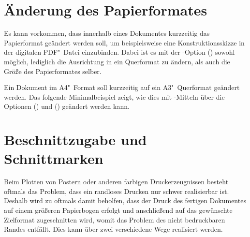 \section{Änderung des Papierformates}
%
%
Es kann vorkommen, dass innerhalb eines Dokumentes kurzzeitig das Papierformat 
geändert werden soll, um beispielsweise eine Konstruktionsskizze in der 
digitalen PDF"~Datei einzubinden. Dabei ist es mit der \KOMAScript-Option 
() sowohl möglich, lediglich die 
Ausrichtung in ein Querformat zu ändern, als auch die Größe des Papierformates 
selber.
%
\begin{Example}
Ein Dokument im A4"~Format soll kurzzeitig auf ein A3"~Querformat geändert 
werden. Das folgende Minimalbeispiel zeigt, wie dies mit \KOMAScript-Mitteln 
über die Optionen () und 
() geändert werden kann.
\end{Example}




\section{Beschnittzugabe und Schnittmarken}
%
%
%
%
Beim Plotten von Postern oder anderen farbigen Druckerzeugnissen besteht 
oftmals das Problem, dass ein randloses Drucken nur schwer realisierbar ist. 
Deshalb wird zu oftmals damit beholfen, dass der Druck des fertigen Dokumentes 
auf einem größeren Papierbogen erfolgt und anschließend auf das gewünschte 
Zielformat zugeschnitten wird, womit das Problem des nicht bedruckbaren Randes 
entfällt. Dies kann über zwei verschiedene Wege realisiert werden.

